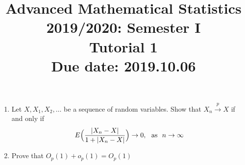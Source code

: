 \documentclass[11pt]{article} %
\theoremstyle{definition}
\begin{document}
\begin{CJK*}{GBK}{song}


\title{ \bf Advanced Mathematical Statistics \\
2019/2020: Semester I\\
Tutorial 1\\
Due date: 2019.10.06}

\author{}

\date{}
\maketitle
\begin{enumerate}
  \item Let $X, X_{1}, X_{2}, \dots $ be a sequence of random variables. Show that $X_{n}\overset{p}{\to} X$ if and only if 
  $$
  E\Big{(} \frac{|X_{n}-X|}{1+|X_{n}-X| }  \Big{)} \to 0, ~~\text{as} ~~ n \to \infty
  $$
  \item Prove that $O_{p}(1)+o_{p}(1)=O_{p}(1)$
\end{enumerate}


\end{CJK*}
\end{document}

